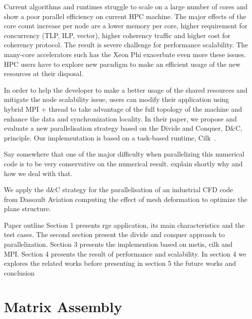 \documentclass{IOS-Book-Article}
\begin{document}
Current algorithms and runtimes struggle to scale on a large number of cores and show a poor parallel efficiency on current HPC machine. 
The major effects of the core count increase per node are a lower memory per core, higher requirement for concurrency (TLP, ILP, vector), higher coherency traffic and higher cost for coherency protocol. The result is severe challenge for performance scalability. The many-core accelerators such has the Xeon Phi exacerbate even more these issues. HPC users have to explore new paradigm to make an efficient usage of the new resources at their disposal. 

In order to help the developer to make a better usage of the shared resources and mitigate the node scalability issue, users can modify their application using hybrid MPI + thread to take advantage of the full topology of the machine and enhance the data and synchronization locality.
In their paper, we propose and evaluate a new parallelisation strategy based on the Divide and Conquer, D\&C, principle. Our implementation is based on a task-based runtime, Cilk~\cite{cilk5}. 

Say somewhere that one of the major difficulty when parallelizing this numerical code is to be very conservative on the numerical result. explain shortly why and how we deal
with that.



We apply the d\&C strategy for the parallelisation of an industrial CFD code from Dassault Aviation computing the effect of mesh deformation to optimize the plane structure.


Paper outline
Section 1 presents rge application, its main characteristics and the test cases.
The second section present the divide and conquer approach to parallelization. 
Section 3 presents the implemention based on metis, cilk and MPI.
Section 4 presents the result of performance and scalability. 
In section 4 we explores the related works before presenting in section 5 the future works and conclusion

\section{Matrix Assembly}


\end{document}
